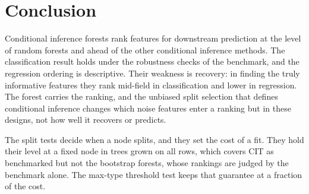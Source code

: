 \section{Conclusion}
\label{sec:conclusion}

Conditional inference forests rank features for downstream prediction at the
level of random forests and ahead of the other conditional inference methods.
The classification result holds under the robustness checks of the benchmark,
and the regression ordering is descriptive. Their weakness is recovery: in finding the truly informative
features they rank mid-field in classification and lower in regression. The forest carries the ranking, and the unbiased split selection that
defines conditional inference changes which noise features enter a ranking but
in these designs, not how well it recovers or predicts.

The split tests decide when a node splits, and they set the cost of a fit.
They hold their level at a fixed node in trees grown on
all rows, which covers CIT as benchmarked but not the bootstrap forests, whose
rankings are judged by the benchmark alone. The max-type threshold test keeps
that guarantee at a fraction of the cost.
